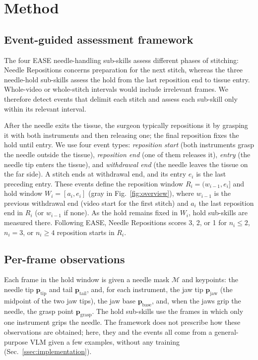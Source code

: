 \section{Method}
\label{sec:method}

\subsection{Event-guided assessment framework}
\label{ssec:framework}

The four EASE needle-handling sub-skills assess different phases of
stitching: Needle Repositions
concerns preparation for the next stitch, whereas the three needle-hold
sub-skills assess the hold from the last reposition end to tissue entry.
Whole-video or whole-stitch intervals would include irrelevant
frames. We therefore detect events that delimit each stitch and assess each
sub-skill only within its relevant interval.

After the needle exits the tissue, the surgeon typically repositions it by
grasping it with both instruments and then releasing one; the final
reposition fixes the hold until entry. We use four event types:
\emph{reposition start} (both instruments grasp the needle outside the
tissue), \emph{reposition end} (one of them releases it), \emph{entry} (the
needle tip enters the tissue), and \emph{withdrawal end} (the needle leaves
the tissue on the far side). A stitch ends at withdrawal end, and its entry
$e_i$ is the last preceding entry. These events define the reposition window
$R_i=(w_{i-1},e_i]$ and hold window $W_i=[a_i,e_i]$
(gray in Fig.~\ref{fig:overview}), where $w_{i-1}$ is the previous withdrawal end
(video start for the first stitch) and $a_i$ the last reposition end in $R_i$
(or $w_{i-1}$ if none). As the hold remains fixed in $W_i$, hold sub-skills
are measured there. Following EASE, Needle Repositions scores 3, 2, or 1 for
$n_i\leq2$, $n_i=3$, or $n_i\geq4$ reposition starts in $R_i$.

\subsection{Per-frame observations}
\label{ssec:observations}

Each frame in the hold window is given a needle mask $\mathcal{M}$ and
keypoints: the needle tip $\mathbf{p}_{\mathrm{tip}}$ and tail
$\mathbf{p}_{\mathrm{tail}}$, and, for each instrument, the jaw tip
$\mathbf{p}_{\mathrm{jaw}}$ (the midpoint of the two jaw tips), the jaw base
$\mathbf{p}_{\mathrm{base}}$, and, when the jaws grip the needle, the grasp
point $\mathbf{p}_{\mathrm{grasp}}$. The hold sub-skills use the frames in
which only one instrument grips the needle. The framework does not prescribe
how these observations are obtained; here, they and the events all come from
a general-purpose VLM given a few examples, without any training
(Sec.~\ref{ssec:implementation}).

